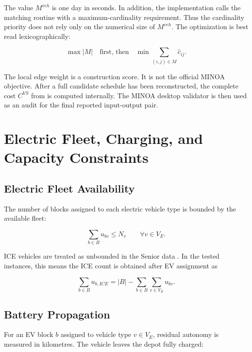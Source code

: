 The value \(M^{veh}\) is one day in seconds. In addition, the implementation calls
the matching routine with a maximum-cardinality requirement. Thus the
cardinality priority does not rely only on the numerical size of \(M^{veh}\). The
optimization is best read lexicographically:

\begin{equation}
\max |M|
\quad\text{first, then}\quad
\min \sum_{(i,j)\in M}\hat c_{ij}.
\label{eq:weighted-lexicographic}
\end{equation}

The local edge weight is a construction score. It is not the official MINOA
objective. After a full candidate schedule has been reconstructed, the
complete cost \(C^{VS}\) from  is computed internally. The
MINOA desktop validator is then used as an audit for the final reported
input-output pair.

\section{Electric Fleet, Charging, and Capacity Constraints}

\subsection{Electric Fleet Availability}

The number of blocks assigned to each electric vehicle type is bounded by the
available fleet:

\begin{equation}
\sum_{b\in B}u_{bv}\le N_v
\qquad
\forall v\in V_E.
\label{eq:ev-fleet-limit}
\end{equation}

ICE vehicles are treated as unbounded in the Senior data
\cite{minoa-problem,minoa-io}. In the tested instances, this means the ICE
count is obtained after EV assignment as

\begin{equation}
\sum_{b\in B}u_{b,ICE}
=
|B|-\sum_{b\in B}\sum_{v\in V_E}u_{bv}.
\label{eq:ice-fleet-count}
\end{equation}

\subsection{Battery Propagation}

For an EV block \(b\) assigned to vehicle type \(v\in V_E\), residual autonomy
is measured in kilometres. The vehicle leaves the depot fully charged:

